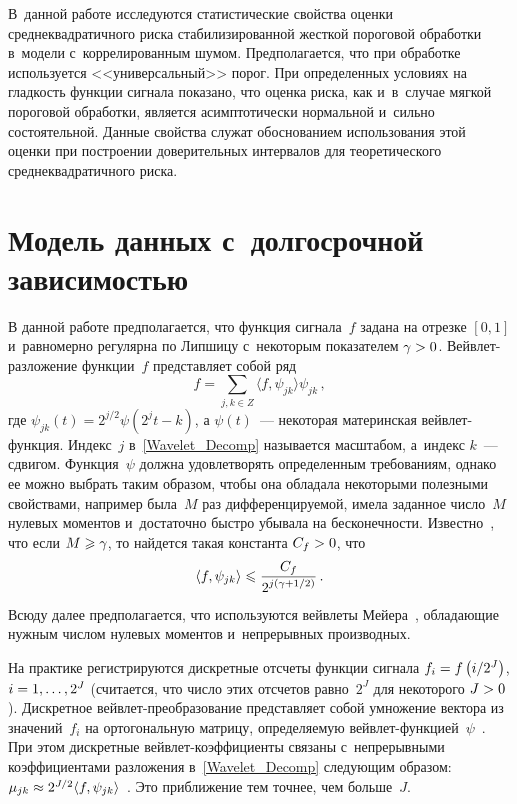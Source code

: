 \begin{multicols}{2}
В~данной работе исследуются статистические 
свойства оценки сред\-не\-квад\-ра\-тич\-но\-го рис\-ка стабилизированной жест\-кой пороговой 
обработки в~модели с~коррелированным шумом. Предполагается, что при обработке 
используется <<универсальный>> порог. При определенных условиях на глад\-кость 
функции сигнала показано, что оценка рис\-ка, как и~в~случае мяг\-кой пороговой 
обработки, является асимп\-то\-ти\-чески нормальной и~сильно со\-сто\-ятель\-ной. Данные 
свойства служат обоснованием использования этой оценки при по\-стро\-ении доверительных 
интервалов для тео\-ре\-ти\-че\-ско\-го среднеквадратичного риска.

\section{Модель данных с~долгосрочной зависимостью}

В данной работе предполагается, что функция сигнала~$f$ задана на отрезке $[0,1]$ 
и~равномерно регулярна по Липшицу с~некоторым показателем $\gamma\hm>0$. 
Вейв\-лет-раз\-ло\-же\-ние функции~$f$ пред\-став\-ля\-ет собой ряд
\begin{equation}
\label{Wavelet_Decomp}
f=\sum\limits_{j,k\in Z}\langle f,\psi_{jk}\rangle\psi_{jk}\,,
\end{equation}
где $\psi_{jk}(t)=2^{j/2}\psi(2^jt-k)$, а $\psi(t)$~--- некоторая материнская 
вейв\-лет-функ\-ция. Индекс~$j$ в~\eqref{Wavelet_Decomp} называется масштабом, 
а~индекс $k$~--- сдвигом. Функция~$\psi$ должна удовле\-тво\-рять определенным 
требованиям, однако ее можно выбрать таким образом, чтобы она обладала 
некоторыми полезными свойствами, например была~$M$ раз дифференцируемой, имела
 заданное чис\-ло~$M$ нулевых моментов и~достаточно быст\-ро убывала на бес\-ко\-неч\-ности. 
 Известно~\cite{Mall99}, что если $M\hm\geqslant\gamma$, то найдется такая 
 константа $C_f\hm>0$, что
\begin{equation}
\label{Coeff_Decay}
\langle f,\psi_{jk}\rangle\leqslant\displaystyle\frac{\displaystyle C_f\mathstrut}{\displaystyle 2^{j\left(\gamma+1/2\right)}\mathstrut}\,.
\end{equation}
Всюду далее предполагается, что используются вейв\-ле\-ты Мейера~\cite{Mall99}, 
обладающие нужным чис\-лом нулевых моментов и~непрерывных производных.

На практике регистрируются дискретные отсчеты функции сигнала $f_i\hm=
f\left(i/2^J\right)$, $i\hm=1,\ldots, 2^J$ (считается, что чис\-ло этих отсчетов 
равно~$2^J$ для некоторого $J\hm>0$). Дискретное вейв\-лет-пре\-обра\-зо\-ва\-ние 
пред\-став\-ля\-ет собой умножение вектора\linebreak
 из значений~$f_i$  на ортогональную мат\-ри\-цу, 
определяемую вейв\-лет-функ\-ци\-ей~$\psi$~\cite{Mall99}. 
При этом дискретные вейв\-лет-ко\-эф\-фи\-ци\-ен\-ты связаны с~непрерывными 
коэффициентами разложения в~\eqref{Wavelet_Decomp}\linebreak
 сле\-ду\-ющим образом: 
$\mu_{jk}\hm\approx 2^{J/2}\langle f,\psi_{jk}\rangle$~\cite{Mall99}. 
Это приближение тем точ\-нее, чем больше~$J$.


\end{multicols}
